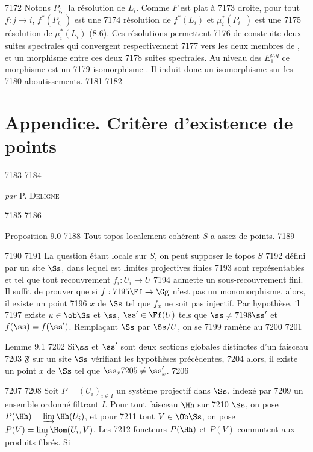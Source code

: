   7172	Notons $P_{i,.}$ la résolution de $L_i$. Comme $F$ est plat à
  7173	droite, pour tout $f : j \to i$, $f^{\ast}(P_{i,.})$ est une
  7174	résolution de $f^{\ast}(L_i)$ et $\mu^{\ast}_i(P_{i,.})$ est une
  7175	  résolution de $\mu^{\ast}_i(L_i)$ (\hyperref[VI.subsec8.6]{8.6}). Ces résolutions permettent
  7176	  de construite deux suites spectrales qui convergent respectivement
  7177	  vers les deux membres de , et un morphisme entre ces deux
  7178	  suites spectrales. Au niveau des $E^{p, q}_1$ ce morphisme est un
  7179	  isomorphisme . Il induit donc un isomorphisme sur les
  7180	  aboutissements.
  7181	
  7182	\section{Appendice. Critère d'existence de points}
  7183	
  7184	\centerline{\textit{par} P. \textsc{Deligne}}
  7185	
  7186		\begin{enonce*}{Proposition 9.0}
  7188	Tout topos localement cohérent $S$ a assez de points.
  7189	\end{enonce*}
  7190	
  7191	La question étant locale sur $S$, on peut supposer le topos $S$
  7192	défini par un site $\Ss$, dans lequel est limites projectives finies
  7193	sont représentables et tel que tout recouvrement $f_i : U_i \to U$
  7194	admette un sous-recouvrement fini. Il suffit de prouver que si $f :
  7195	\Ff \to \Gg$ n'est pas un monomorphisme, alors, il existe un point
  7196	$x$ de $\Ss$ tel que $f_x$ ne soit pas injectif. Par hypothèse, il
  7197	existe $u \in \ob \Ss$ et $\ss$, $\ss'\in \Ff(U)$ tels que $\ss \neq
  7198	\ss'$ et $f(\ss) = f(\ss')$. Remplaçant $\Ss$ par $\Ss/U$, on se
  7199	ramène au
  7200	
  7201	\begin{enonce*}{Lemme 9.1}
  7202	Si\pageoriginale $\ss$ et $\ss'$ sont deux sections globales distinctes d'un faisceau
  7203	$\mathfrak{F}$ sur un site $\Ss$ vérifiant les hypothèses précédentes,
  7204	alors, il existe un point $x$ de $\Ss$ tel que $\ss_x
  7205	\neq \ss'_x$.
  7206	\end{enonce*}
  7207	
  7208	Soit $P = (U_i)_{i \in I}$ un système projectif dans $\Ss$, indexé par
  7209	un ensemble ordonné filtrant $I$. Pour tout faisceau $\Hh$ sur
  7210	$\Ss$, on pose $P(\Hh) = \varinjlim \Hh(U_i)$, et pour
  7211	tout $V \in \Ob \Ss$, on pose $P(V) = \varinjlim \Hom (U_i, V)$. Les
  7212	foncteurs $P(\Hh)$ et $P(V)$ commutent aux produits fibrés. Si
